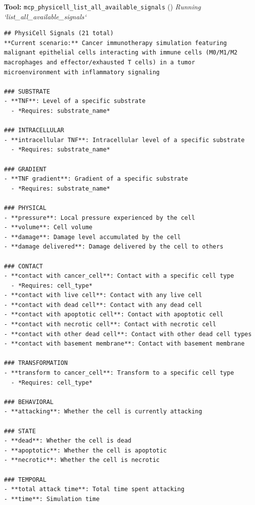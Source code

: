 \documentclass[11pt,a4paper]{article}
\begin{document}
\begin{toolokbox}
\textbf{Tool:} \texttt{mcp\_physicell\_list\_all\_available\_signals} (\checkmark)
\textit{Running `list\_all\_available\_signals`}
\begin{lstlisting}
## PhysiCell Signals (21 total)
**Current scenario:** Cancer immunotherapy simulation featuring malignant epithelial cells interacting with immune cells (M0/M1/M2 macrophages and effector/exhausted T cells) in a tumor microenvironment with inflammatory signaling

### SUBSTRATE
- **TNF**: Level of a specific substrate
  - *Requires: substrate_name*

### INTRACELLULAR
- **intracellular TNF**: Intracellular level of a specific substrate
  - *Requires: substrate_name*

### GRADIENT
- **TNF gradient**: Gradient of a specific substrate
  - *Requires: substrate_name*

### PHYSICAL
- **pressure**: Local pressure experienced by the cell
- **volume**: Cell volume
- **damage**: Damage level accumulated by the cell
- **damage delivered**: Damage delivered by the cell to others

### CONTACT
- **contact with cancer_cell**: Contact with a specific cell type
  - *Requires: cell_type*
- **contact with live cell**: Contact with any live cell
- **contact with dead cell**: Contact with any dead cell
- **contact with apoptotic cell**: Contact with apoptotic cell
- **contact with necrotic cell**: Contact with necrotic cell
- **contact with other dead cell**: Contact with other dead cell types
- **contact with basement membrane**: Contact with basement membrane

### TRANSFORMATION
- **transform to cancer_cell**: Transform to a specific cell type
  - *Requires: cell_type*

### BEHAVIORAL
- **attacking**: Whether the cell is currently attacking

### STATE
- **dead**: Whether the cell is dead
- **apoptotic**: Whether the cell is apoptotic
- **necrotic**: Whether the cell is necrotic

### TEMPORAL
- **total attack time**: Total time spent attacking
- **time**: Simulation time


\end{lstlisting}
\end{toolokbox}
\end{document}
